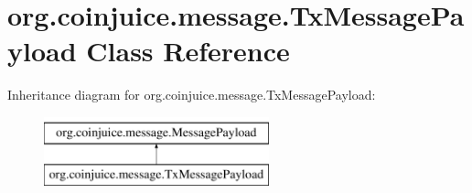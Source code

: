 \hypertarget{classorg_1_1coinjuice_1_1message_1_1_tx_message_payload}{\section{org.\-coinjuice.\-message.\-Tx\-Message\-Payload Class Reference}
\label{classorg_1_1coinjuice_1_1message_1_1_tx_message_payload}
}
Inheritance diagram for org.\-coinjuice.\-message.\-Tx\-Message\-Payload\-:\begin{figure}[H]
\begin{center}
\leavevmode
\includegraphics[height=2.000000cm]{classorg_1_1coinjuice_1_1message_1_1_tx_message_payload}
\end{center}
\end{figure}
